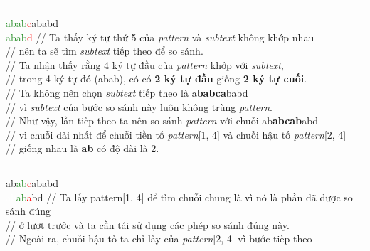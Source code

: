 \documentclass[a4paper,11pt]{article}
\begin{document}
			\vspace*{2mm}
			\hrule
			\textcolor{ForestGreen}{abab}\textcolor{red}{c}ababd\\
			\textcolor{ForestGreen}{abab}\textcolor{red}{d}			\hspace*{1.8cm} // Ta thấy ký tự thứ 5 của \textit{pattern} và \textit{subtext} không khớp nhau\\
																	\hspace*{2.9cm} // nên ta sẽ tìm \textit{subtext} tiếp theo để so sánh. \\
																	\hspace*{2.9cm} // Ta nhận thấy rằng 4 ký tự đầu của \textit{pattern} khớp với \textit{subtext}, \\
																	\hspace*{2.9cm} // trong 4 ký tự đó (abab), có có \textbf{2 ký tự đầu} giống \textbf{2 ký tự cuối}. \\
																	\hspace*{2.9cm} // Ta không nên chọn \textit{subtext} tiếp theo là a\textbf{babca}babd\\
																	\hspace*{2.9cm} // vì \textit{subtext} của bước so sánh này luôn không trùng \textit{pattern}.\\
																	\hspace*{2.9cm} // Như vậy, lần tiếp theo ta nên so sánh \textit{pattern} với chuỗi ab\textbf{abcab}abd\\
																	\hspace*{2.9cm} // vì chuỗi dài nhất để chuỗi tiền tố \textit{pattern}[1, 4] và chuỗi hậu tố \textit{pattern}[2, 4] \\
																	\hspace*{2.9cm} // giống nhau là \textbf{ab} có độ dài là 2.													
			\vspace*{2mm}
			\hrule
			ab\textcolor{ForestGreen}{ab}\textcolor{red}{c}ababd\\
			\textcolor{white}{ab}\textcolor{ForestGreen}{ab}\textcolor{red}{a}bd 			\hspace*{1.4cm} // Ta lấy pattern[1, 4] để tìm chuỗi chung là vì nó là phần đã được so sánh đúng \\
																							\hspace*{2.9cm} // ở lượt trước và ta cần tái sử dụng các phép so sánh đúng này.\\
																							\hspace*{2.9cm} // Ngoài ra, chuỗi hậu tố ta chỉ lấy của \textit{pattern}[2, 4] vì bước tiếp theo \\
\end{document}
